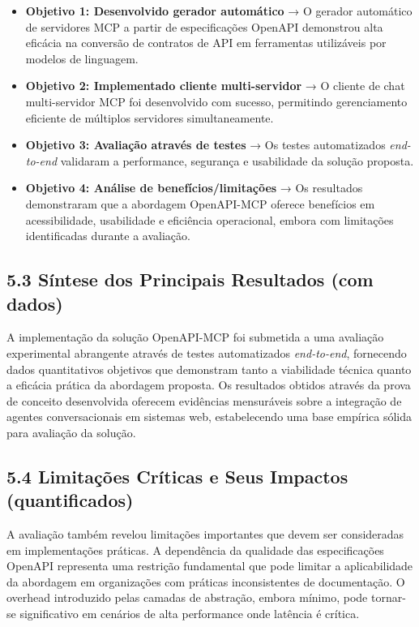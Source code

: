 \documentclass[
]{article}
\providecommand{\tightlist}{%
  \setlength{\itemsep}{0pt}\setlength{\parskip}{0pt}}
\begin{document}
\begin{itemize}
\tightlist
\item
  \textbf{Objetivo 1: Desenvolvido gerador automático} → O gerador
  automático de servidores MCP a partir de especificações OpenAPI
  demonstrou alta eficácia na conversão de contratos de API em
  ferramentas utilizáveis por modelos de linguagem.
\item
  \textbf{Objetivo 2: Implementado cliente multi-servidor} → O cliente
  de chat multi-servidor MCP foi desenvolvido com sucesso, permitindo
  gerenciamento eficiente de múltiplos servidores simultaneamente.
\item
  \textbf{Objetivo 3: Avaliação através de testes} → Os testes
  automatizados \emph{end-to-end} validaram a performance, segurança e
  usabilidade da solução proposta.
\item
  \textbf{Objetivo 4: Análise de benefícios/limitações} → Os resultados
  demonstraram que a abordagem OpenAPI-MCP oferece benefícios em
  acessibilidade, usabilidade e eficiência operacional, embora com
  limitações identificadas durante a avaliação.
\end{itemize}

\subsection{5.3 Síntese dos Principais Resultados (com
dados)}\label{suxedntese-dos-principais-resultados-com-dados}

A implementação da solução OpenAPI-MCP foi submetida a uma avaliação
experimental abrangente através de testes automatizados
\emph{end-to-end}, fornecendo dados quantitativos objetivos que
demonstram tanto a viabilidade técnica quanto a eficácia prática da
abordagem proposta. Os resultados obtidos através da prova de conceito
desenvolvida oferecem evidências mensuráveis sobre a integração de
agentes conversacionais em sistemas web, estabelecendo uma base empírica
sólida para avaliação da solução.

\subsection{5.4 Limitações Críticas e Seus Impactos
(quantificados)}\label{limitauxe7uxf5es-cruxedticas-e-seus-impactos-quantificados}

A avaliação também revelou limitações importantes que devem ser
consideradas em implementações práticas. A dependência da qualidade das
especificações OpenAPI representa uma restrição fundamental que pode
limitar a aplicabilidade da abordagem em organizações com práticas
inconsistentes de documentação. O overhead introduzido pelas camadas de
abstração, embora mínimo, pode tornar-se significativo em cenários de
alta performance onde latência é crítica.
\end{document}
